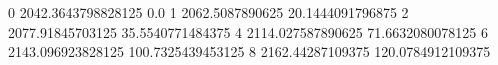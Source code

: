 0 2042.3643798828125 0.0
1 2062.5087890625 20.1444091796875
2 2077.91845703125 35.5540771484375
4 2114.027587890625 71.6632080078125
6 2143.096923828125 100.7325439453125
8 2162.44287109375 120.0784912109375
